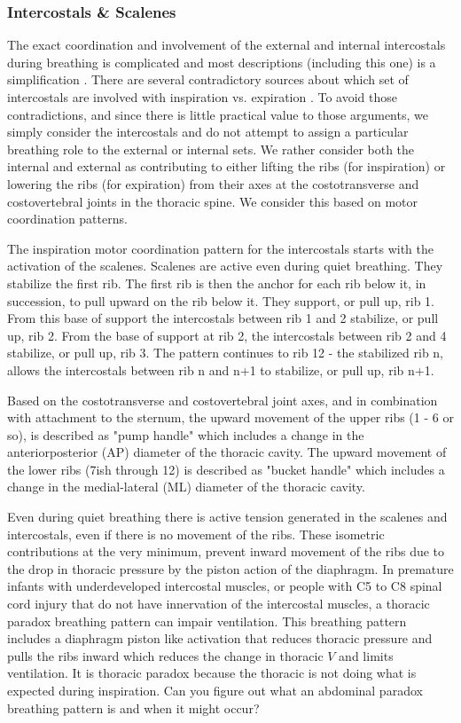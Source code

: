 \subsubsection{Intercostals \& Scalenes}

The exact coordination and involvement of the external and internal intercostals during breathing is complicated and most descriptions (including this one) is a simplification \cite{lumb_nunns_2020, de_troyer_respiratory_2005}. There are several contradictory sources about which set of intercostals are involved with inspiration vs. expiration \cite{lumb_nunns_2020, hall_guyton_2020}. To avoid those contradictions, and since there is little practical value to those arguments, we simply consider the intercostals and do not attempt to assign a particular breathing role to the external or internal sets. We rather consider both the internal and external as contributing to either lifting the ribs (for inspiration) or lowering the ribs (for expiration) from their axes at the costotransverse and costovertebral joints in the thoracic spine. We consider this based on motor coordination patterns.

The inspiration motor coordination pattern for the intercostals starts with the activation of the scalenes. Scalenes are active even during quiet breathing. They stabilize the first rib. The first rib is then the anchor for each rib below it, in succession, to pull upward on the rib below it. They support, or pull up, rib 1. From this base of support the intercostals between rib 1 and 2 stabilize, or pull up, rib 2. From the base of support at rib 2, the intercostals between rib 2 and 4 stabilize, or pull up, rib 3. The pattern continues to rib 12 - the stabilized rib n, allows the intercostals between rib n and n+1 to stabilize, or pull up, rib n+1.

Based on the costotransverse and costovertebral joint axes, and in combination with attachment to the sternum, the upward movement of the upper ribs (1 - 6 or so), is described as "pump handle" which includes a change in the anteriorposterior (AP) diameter of the thoracic cavity. The upward movement of the lower ribs (7ish through 12) is described as "bucket handle" which includes a change in the medial-lateral (ML) diameter of the thoracic cavity.

Even during quiet breathing there is active tension generated in the scalenes and intercostals, even if there is no movement of the ribs. These isometric contributions at the very minimum, prevent inward movement of the ribs due to the drop in thoracic pressure by the piston action of the diaphragm. In premature infants with underdeveloped intercostal muscles, or people with C5 to C8 spinal cord injury that do not have innervation of the intercostal muscles, a thoracic paradox breathing pattern can impair ventilation. This breathing pattern includes a diaphragm piston like activation that reduces thoracic pressure and pulls the ribs inward which reduces the change in thoracic $V$ and limits ventilation. It is thoracic paradox because the thoracic is not doing what is expected during inspiration. Can you figure out what an abdominal paradox breathing pattern is and when it might occur?

